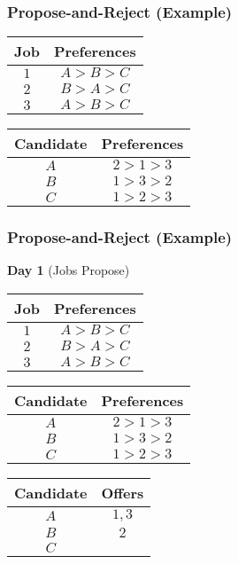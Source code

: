 \documentclass{beamer}
\begin{document}
\begin{frame}
    \frametitle{Propose-and-Reject (Example)}
    \begin{center}
        \begin{tabular}{c|c}
            Job & Preferences \\
            \hline
            $1$ & $A>B>C$\\
            $2$ & $B>A>C$\\
            $3$ & $A>B>C$
        \end{tabular}
        \hspace{10pt}
        \begin{tabular}{c|c}
            Candidate & Preferences \\
            \hline
            $A$ & $2>1>3$\\
            $B$ & $1>3>2$\\
            $C$ & $1>2>3$
        \end{tabular}
    \end{center}
\end{frame}

\begin{frame}
    \frametitle{Propose-and-Reject (Example)}
    {\bf Day 1} (Jobs Propose)
    \begin{center}
        \begin{tabular}{c|c}
            Job & Preferences \\
            \hline
            $1$ & $A>B>C$\\
            $2$ & $B>A>C$\\
            $3$ & $A>B>C$
        \end{tabular}
        \hspace{10pt}
        \begin{tabular}{c|c}
            Candidate & Preferences \\
            \hline
            $A$ & $2>1>3$\\
            $B$ & $1>3>2$\\
            $C$ & $1>2>3$
        \end{tabular}
    \end{center}
    \begin{center}
        \begin{tabular}{c|c}
            Candidate & Offers \\
            \hline
            $A$ & $1,3$ \\
            $B$ & $2$ \\
            $C$ & 
        \end{tabular}
    \end{center}
\end{frame}
\end{document}
